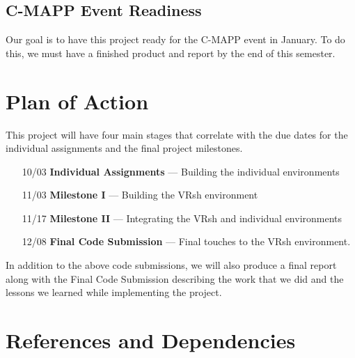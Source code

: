 \documentclass[titlepage,12pt]{article}
\begin{document}
\subsection{C-MAPP Event Readiness}
Our goal is to have this project ready for the C-MAPP event in January. To do
this, we must have a finished product and report by the end of this semester.

\section{Plan of Action}

This project will have four main stages that correlate with the due dates for
the individual assignments and the final project milestones.

\begin{enumerate}[leftmargin=*]
    \item [10/03] \textbf{Individual Assignments} --- Building the individual
        environments
    \item [11/03] \textbf{Milestone I} --- Building the VRsh environment
    \item [11/17] \textbf{Milestone II} --- Integrating the VRsh and individual
        environments
    \item [12/08] \textbf{Final Code Submission} --- Final touches to the VRsh
        environment.
\end{enumerate}

In addition to the above code submissions, we will also produce a final report
along with the Final Code Submission describing the work that we did and the
lessons we learned while implementing the project.

\section{References and Dependencies}
\end{document}
